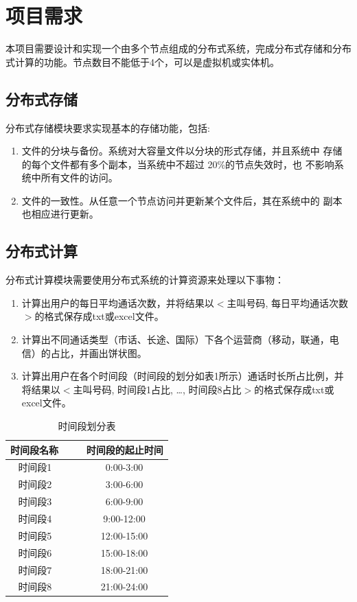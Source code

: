 \documentclass[12pt,a4paper]{article}
\begin{document}
\justifying
\setlength{\parindent}{2em}



\tableofcontents
\clearpage

\section{项目需求}
本项目需要设计和实现一个由多个节点组成的分布式系统，完成分布式存储和分布式计算的功能。节点数目不能低于4个，可以是虚拟机或实体机。
\subsection{分布式存储}
分布式存储模块要求实现基本的存储功能，包括:
\begin{enumerate}
	\item 文件的分块与备份。系统对大容量文件以分块的形式存储，并且系统中
	存储的每个文件都有多个副本，当系统中不超过 20\%的节点失效时，也
	不影响系统中所有文件的访问。 
	\item 文件的一致性。从任意一个节点访问并更新某个文件后，其在系统中的
	副本也相应进行更新。 
\end{enumerate}
\subsection{分布式计算}
分布式计算模块需要使用分布式系统的计算资源来处理以下事物：
\begin{enumerate}
	\item 计算出用户的每日平均通话次数，并将结果以$<$主叫号码, 每日平均通话次数$>$的格式保存成txt或excel文件。
	\item 计算出不同通话类型（市话、长途、国际）下各个运营商（移动，联通，电信）的占比，并画出饼状图。 
	\item 计算出用户在各个时间段（时间段的划分如表1所示）通话时长所占比例，并将结果以$<$主叫号码, 时间段1占比, \ldots, 时间段8占比$>$的格式保存成txt或excel文件。
\end{enumerate}

\begin{table}[htb]
\caption{时间段划分表}
\centering
\begin{tabular}{c c}
\label{time period}
\\
\hline
\hline
\textbf{时间段名称} ~ & ~ \textbf{时间段的起止时间} \\[6pt]
\hline
时间段1 ~ & ~ 0:00-3:00 \\[6pt]
\hline
时间段2 ~ & ~ 3:00-6:00 \\[6pt]
\hline
时间段3 ~ & ~ 6:00-9:00 \\[6pt]
\hline
时间段4 ~ & ~ 9:00-12:00 \\[6pt]
\hline
时间段5 ~ & ~ 12:00-15:00 \\[6pt]
\hline
时间段6 ~ & ~ 15:00-18:00 \\[6pt]
\hline
时间段7 ~ & ~ 18:00-21:00 \\[6pt]
\hline
时间段8 ~ & ~ 21:00-24:00 \\[6pt]
\hline
\hline
\end{tabular}
\end{table}
\end{document}
